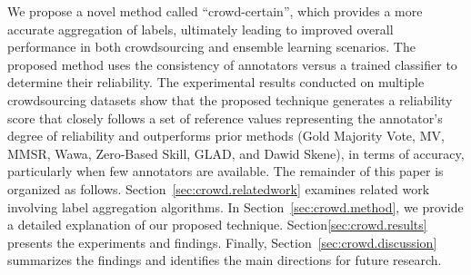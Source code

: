 We propose a novel method called ``crowd-certain'', which provides a more accurate aggregation of labels, ultimately leading to improved overall performance in both crowdsourcing and ensemble learning scenarios. The proposed method uses the consistency of annotators versus a trained classifier to determine their reliability. The experimental results conducted on multiple crowdsourcing datasets show that the proposed technique generates a reliability score that closely follows  a set of reference values representing the annotator's degree of reliability and outperforms prior methods (Gold Majority Vote, MV, MMSR, Wawa, Zero-Based Skill, GLAD, and Dawid Skene), in terms of accuracy, particularly when few annotators are available.
The remainder of this paper is organized as follows. Section~\ref{sec:crowd.relatedwork} examines related work involving label aggregation algorithms. In Section~\ref{sec:crowd.method}, we provide a detailed explanation of our proposed technique. Section\ref{sec:crowd.results} presents the experiments and findings. Finally, Section~\ref{sec:crowd.discussion} summarizes the findings and identifies the main directions for future research.

